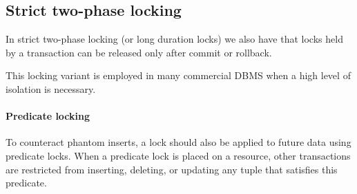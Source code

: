 \subsection{Strict two-phase locking}
\begin{definition}
    In strict two-phase locking (or long duration locks) we also have that locks held by a transaction can be released only after commit or rollback.
\end{definition}
This locking variant is employed in many commercial DBMS when a high level of isolation is necessary.

\paragraph*{Predicate locking}
To counteract phantom inserts, a lock should also be applied to future data using predicate locks. 
When a predicate lock is placed on a resource, other transactions are restricted from inserting, deleting, or updating any tuple that satisfies this predicate.